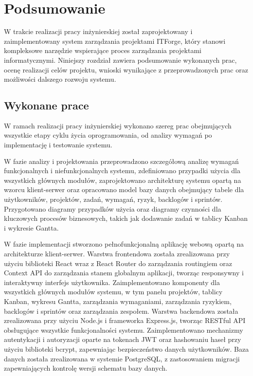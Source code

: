 \chapter{Podsumowanie}\label{chapter:conclusions}

W trakcie realizacji pracy inżynierskiej został zaprojektowany i zaimplementowany system zarządzania projektami ITForge, który stanowi kompleksowe narzędzie wspierające proces zarządzania projektami informatycznymi. Niniejszy rozdział zawiera podsumowanie wykonanych prac, ocenę realizacji celów projektu, wnioski wynikające z przeprowadzonych prac oraz możliwości dalszego rozwoju systemu.

\section{Wykonane prace}

W ramach realizacji pracy inżynierskiej wykonano szereg prac obejmujących wszystkie etapy cyklu życia oprogramowania, od analizy wymagań po implementację i testowanie systemu.

W fazie analizy i projektowania przeprowadzono szczegółową analizę wymagań funkcjonalnych i niefunkcjonalnych systemu, zdefiniowano przypadki użycia dla wszystkich głównych modułów, zaprojektowano architekturę systemu opartą na wzorcu klient-serwer oraz opracowano model bazy danych obejmujący tabele dla użytkowników, projektów, zadań, wymagań, ryzyk, backlogów i sprintów. Przygotowano diagramy przypadków użycia oraz diagramy czynności dla kluczowych procesów biznesowych, takich jak dodawanie zadań w tablicy Kanban i wykresie Gantta.

W fazie implementacji stworzono pełnofunkcjonalną aplikację webową opartą na architekturze klient-serwer. Warstwa frontendowa została zrealizowana przy użyciu biblioteki React wraz z React Router do zarządzania routingiem oraz Context API do zarządzania stanem globalnym aplikacji, tworząc responsywny i interaktywny interfejs użytkownika. Zaimplementowano komponenty dla wszystkich głównych modułów systemu, w tym panelu projektów, tablicy Kanban, wykresu Gantta, zarządzania wymaganiami, zarządzania ryzykiem, backlogów i sprintów oraz zarządzania zespołem. Warstwa backendowa została zrealizowana przy użyciu Node.js i frameworka Express.js, tworząc RESTful API obsługujące wszystkie funkcjonalności systemu. Zaimplementowano mechanizmy autentykacji i autoryzacji oparte na tokenach JWT oraz hashowaniu haseł przy użyciu biblioteki bcrypt, zapewniając bezpieczeństwo danych użytkowników. Baza danych została zrealizowana w systemie PostgreSQL, z zastosowaniem migracji zapewniających kontrolę wersji schematu bazy danych.


